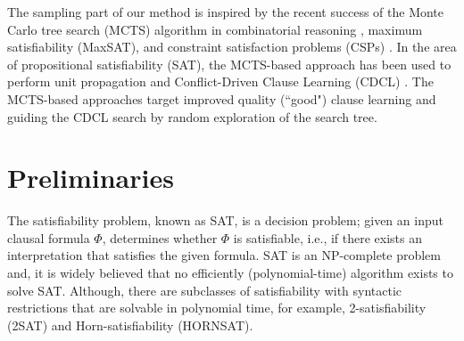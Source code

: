 \documentclass[runningheads]{llncs}
\newcommand{\FFF}{\Phi}
\begin{document}
The sampling part of our method is inspired by the recent success of the Monte Carlo tree search (MCTS) algorithm in combinatorial reasoning \cite{Browne2012, Jooken2020}, maximum satisfiability (MaxSAT), \cite{GoffinetR16} and constraint satisfaction problems (CSPs) \cite{Loth2013}.
In the area of propositional satisfiability (SAT), the MCTS-based approach \cite{PrevitiRSS11, Schloeter2017} has been used to perform unit propagation \cite{DavisP60} and Conflict-Driven Clause Learning (CDCL) \cite{MoskewiczMZZM01}. The MCTS-based approaches target improved quality (``good") clause learning \cite{Schloeter2017, Keszocze2020} and guiding the CDCL search by random exploration \cite{Chowdhury19, Chowdhury2020} of the search tree.



\section{Preliminaries} \label{sec:preliminaries}
The satisfiability problem, known as SAT, is a decision problem; given an input clausal formula $\FFF$, determines whether $\FFF$ is satisfiable, i.e., if there exists an interpretation that satisfies the given formula. SAT is an NP-complete problem \cite{Cook71} and, it is widely believed that no efficiently (polynomial-time) algorithm exists to solve SAT. Although, there are subclasses of satisfiability  with syntactic restrictions that are solvable in polynomial time, for example,  2-satisfiability (2SAT) and Horn-satisfiability (HORNSAT).
\end{document}
